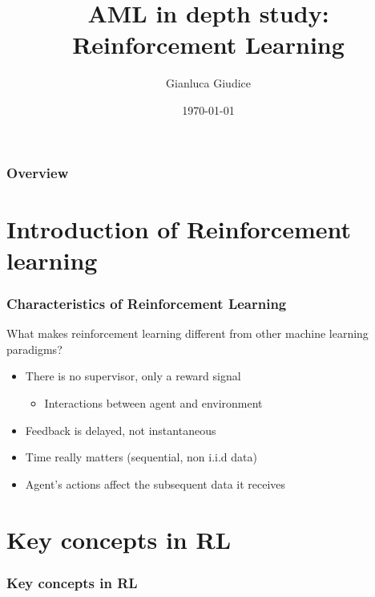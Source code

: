\documentclass[10pt]{beamer}
\title{AML in depth study: Reinforcement Learning}
\author{
 Gianluca Giudice
}
\institute[UNIMIB] %
{
University of Milano-Bicocca\\
\medskip
\textit{g.giudice2@campus.unimib.it}
}
\date{\today} %
\begin{document}
\begin{frame}
\titlepage %
\end{frame}

\begin{frame}
\frametitle{Overview} %
\tableofcontents %
\end{frame}

\section{Introduction of Reinforcement learning}

\begin{frame}
\frametitle{Characteristics of Reinforcement Learning}

What makes reinforcement learning different from other machine learning paradigms?
\begin{itemize}
\item There is no supervisor, only a reward signal
\begin{itemize}
	\item Interactions between agent and environment
\end{itemize}
\item Feedback is delayed, not instantaneous
\item Time really matters (sequential, non i.i.d data)
\item Agent's actions affect the subsequent data it receives
\end{itemize}

\end{frame}

\section{Key concepts in RL}

\begin{frame}
\frametitle{Key concepts in RL}

\tableofcontents[ 
currentsubsection, 
hideothersubsections, 
sectionstyle=show/shaded,
]

\end{frame}
\end{document}
